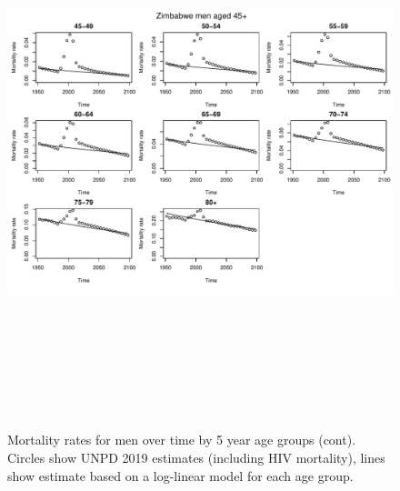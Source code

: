 \documentclass{article}
\begin{document}
\begin{figure}
\includegraphics[width=16cm,height=16cm]{EstimatingRatesFromUNPDv2-MortalityMen2} 

\caption{Mortality rates for men over time by 5 year age groups (cont). Circles show UNPD 2019 estimates (including HIV mortality), lines show estimate based on a log-linear model for each age group.}
\label{Mortalitymen1}
\end{figure}
\end{document}
